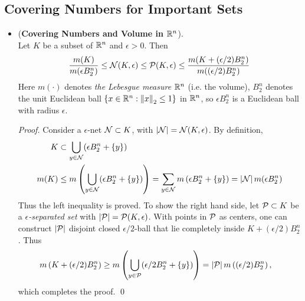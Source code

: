 \documentclass[11pt]{article}
\begin{document}
\subsection{Covering Numbers for Important Sets}
\begin{itemize}
\item \begin{theorem} (\textbf{Covering Numbers and Volume in ${\mathbb R}^n$}). \citep{vershynin2018high}\\
Let $K$ be a subset of ${\mathbb R}^n$ and  $\epsilon > 0$. Then
\begin{align}
\frac{m(K)}{m(\epsilon B_2^n)} \le {\mathcal N}(K, \epsilon) \le {\mathcal P}(K, \epsilon) \le \frac{m(K + (\epsilon/2) B_2^n)}{m((\epsilon/2) B_2^n)}  \label{ineqn: cover_num_vol_rn}
\end{align}
Here $m(\cdot)$ denotes \emph{the Lebesgue measure} ${\mathbb R}^n$ (i.e. the volume), $B_2^n$ denotes the unit Euclidean ball $\left\{x \in {\mathbb R}^n: \left\|x\right\|_{2} \le 1\right\}$ in ${\mathbb R}^n$, so $\epsilon B_2^n$  is a Euclidean ball with radius $\epsilon$.
\end{theorem}
\begin{proof}
Consider a $\epsilon$-net ${\mathcal N} \subset K$, with $\left\lvert {\mathcal N} \right\rvert = {\mathcal N}(K, \epsilon)$. By definition, 
\begin{align*}
K &\subset \bigcup_{y \in {\mathcal N}}(\epsilon B_2^n+\left\{y\right\}) \\
m(K) &\le m\left(\bigcup_{y \in {\mathcal N}}(\epsilon B_2^n+\left\{y\right\})\right) = \sum_{y \in {\mathcal N}}m\left(\epsilon B_2^n+\left\{y\right\}\right) = \left\lvert {\mathcal N} \right\rvert m(\epsilon B_2^n)
\end{align*} Thus the left inequality is proved. To show the right hand side, let ${\mathcal P} \subset K$ be a \emph{$\epsilon$-separated set} with $\left\lvert {\mathcal P} \right\rvert = {\mathcal P}(K, \epsilon)$. With points in ${\mathcal P}$ as centers, one can construct  $\left\lvert {\mathcal P} \right\rvert$ disjoint closed $\epsilon/2$-ball that lie completely inside $K + (\epsilon/2) B_2^n$. Thus
\begin{align*}
m\left(K + (\epsilon/2) B_2^n\right) &\ge m\left(\bigcup_{y \in {\mathcal P}}(\epsilon/2 B_2^n+\left\{y\right\})\right) = \left\lvert {\mathcal P} \right\rvert m\left((\epsilon/2) B_2^n\right),
\end{align*} which completes the proof. \qed
\end{proof}


\end{itemize}
\end{document}
